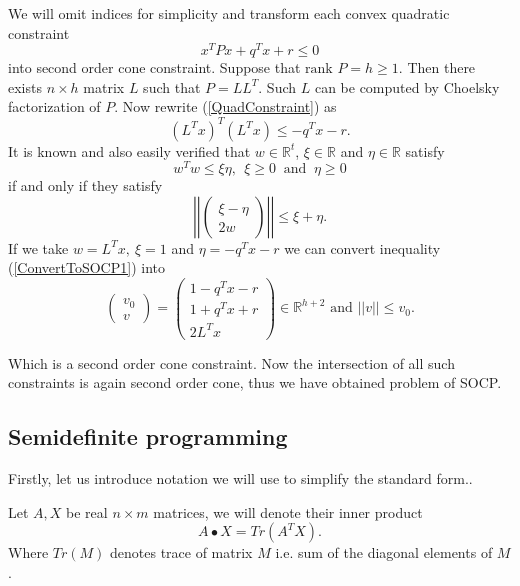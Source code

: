 \documentclass[10pt,oneside]{book}
\theoremstyle{definition}
\begin{document}
We will omit indices for simplicity and transform each convex quadratic constraint 
\begin{equation}
\label{QuadConstraint}
x^TPx + q^Tx + r \leq 0
\end{equation} 
into second order cone constraint.  Suppose that $\mbox{rank }P = h\geq 1.$ Then there exists $n\times h$ matrix $L$ such that $P=LL^T$. Such $L$ can be computed by Choelsky factorization of $P$. Now rewrite (\ref{QuadConstraint}) as 
\begin{equation}
\label{ConvertToSOCP1}
(L^Tx)^T(L^Tx)\leq -q^Tx - r.
\end{equation}
It is known and also easily verified that $w\in \mathbb{R}^t$, $\xi \in \mathbb{R}$ and $\eta \in \mathbb{R}$ satisfy
$$w^Tw\leq \xi\eta, \ \ \xi\geq 0\ \mbox{ and } \ \eta\geq 0$$
if and only if they satisfy
$$\left|\left|\left( \begin{array}{c}
\xi-\eta\\
2w
\end{array}\right)\right|\right|
\leq \xi+\eta . $$
If we take $w=L^Tx, \ \xi = 1$ and $\eta = -q^Tx - r$ we can convert inequality (\ref{ConvertToSOCP1}) into
\begin{equation}
\label{ConvertedQCintoSOCC}
\left(\begin{array}{c}
v_0\\
v
\end{array}\right) = 
\left(\begin{array}{c}
1- q^Tx - r\\
1 + q^Tx + r\\
2L^Tx
\end{array}\right)\in \mathbb{R}^{h+2}
\mbox{  and  } ||v||\leq v_0.
\end{equation}

Which is a second order cone constraint. Now the intersection of all such constraints is again second order cone, thus we have obtained problem of SOCP. 


\subsection{Semidefinite programming}


Firstly, let us introduce notation we will use to simplify the standard form..

 Let $A,X$ be real $n\times m$ matrices, we will denote their inner product 
$$A\bullet X = Tr(A^TX).$$
Where $Tr(M)$ denotes trace of matrix $M$ i.e. sum of the diagonal elements of $M$.
\end{document}
